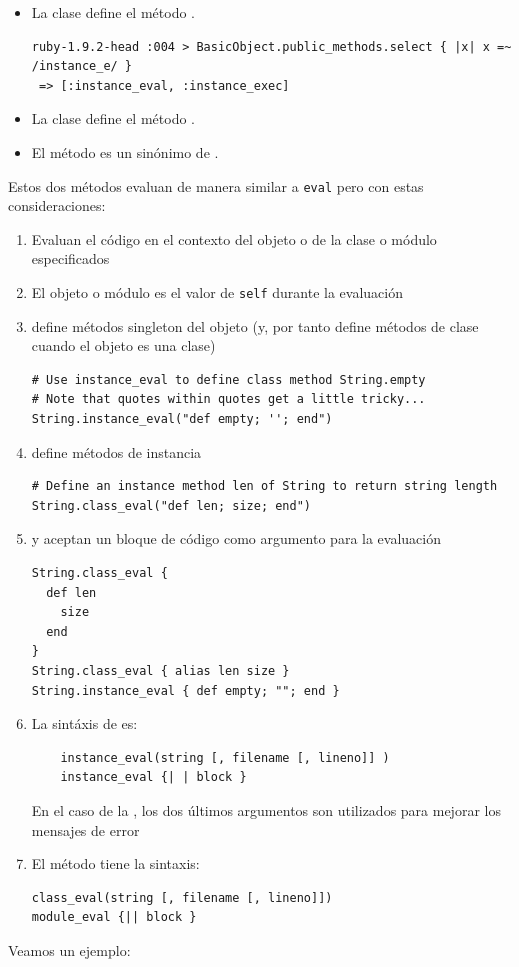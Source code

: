 \begin{itemize}
\item
La clase  define el método .
\begin{verbatim}
ruby-1.9.2-head :004 > BasicObject.public_methods.select { |x| x =~ /instance_e/ }
 => [:instance_eval, :instance_exec] 
\end{verbatim}
\item
La clase  define el método .
\item El método  es un sinónimo de .
\end{itemize}
Estos dos métodos evaluan de manera similar a \verb|eval| pero con estas consideraciones:
\begin{enumerate}
\item Evaluan el código en el contexto del objeto o de la clase o módulo especificados
\item El objeto o módulo es el valor de \verb|self| durante la evaluación
\item
{} define métodos singleton del objeto 
(y, por tanto define métodos de clase cuando el objeto es una clase)
\begin{verbatim}
# Use instance_eval to define class method String.empty
# Note that quotes within quotes get a little tricky...
String.instance_eval("def empty; ''; end")
\end{verbatim}
\item
{} define métodos de instancia 
\begin{verbatim}
# Define an instance method len of String to return string length
String.class_eval("def len; size; end")
\end{verbatim}
\item {} y   aceptan un bloque de código como argumento para la evaluación
\begin{verbatim}
String.class_eval {
  def len
    size
  end
}
String.class_eval { alias len size }
String.instance_eval { def empty; ""; end }
\end{verbatim}

\item
La sintáxis de  es:
\begin{verbatim}
    instance_eval(string [, filename [, lineno]] ) 
    instance_eval {| | block } 
\end{verbatim}
En el caso de la \String{}, los dos últimos argumentos 
son utilizados para mejorar los mensajes de error
\item
El método  tiene la sintaxis:

\begin{verbatim}
class_eval(string [, filename [, lineno]])
module_eval {|| block }
\end{verbatim}
\end{enumerate}
Veamos un ejemplo:


